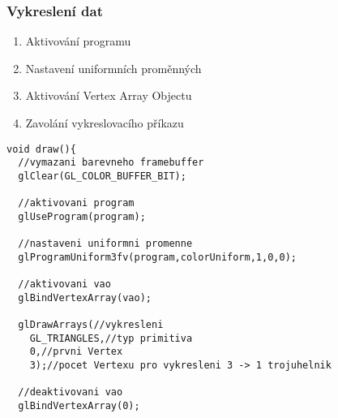 \begin{frame}[fragile]
\frametitle{Vykreslení dat}
  \begin{enumerate}
  \item Aktivování programu
  \item Nastavení uniformních proměnných
  \item Aktivování Vertex Array Objectu
  \item Zavolání vykreslovacího příkazu
  \end{enumerate}
{\scriptsize
\begin{verbatim}
void draw(){
  //vymazani barevneho framebuffer
  glClear(GL_COLOR_BUFFER_BIT);

  //aktivovani program
  glUseProgram(program);

  //nastaveni uniformni promenne
  glProgramUniform3fv(program,colorUniform,1,0,0);

  //aktivovani vao
  glBindVertexArray(vao);

  glDrawArrays(//vykresleni
    GL_TRIANGLES,//typ primitiva
    0,//prvni Vertex
    3);//pocet Vertexu pro vykresleni 3 -> 1 trojuhelnik

  //deaktivovani vao
  glBindVertexArray(0);
\end{verbatim}
}
\end{frame}

